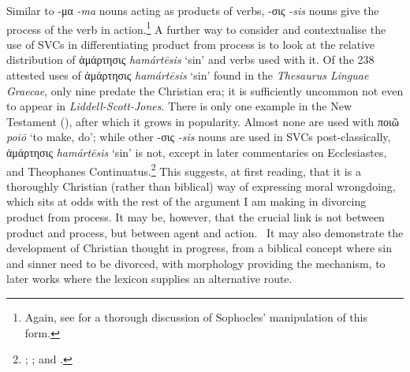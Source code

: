 \documentclass[output=paper,colorlinks,citecolor=brown]{langscibook}
\begin{document}
Similar to -μα \textit{-ma} nouns acting as products of verbs, -σις \textit{-sis} nouns give the
process of the verb in action.\footnote{Again, see \citet{long_language_1968} for a
  thorough discussion of Sophocles' manipulation of this form.} 
  A
further way to consider and contextualise the use of SVCs in
differentiating product from process is to look at the relative
distribution of ἁμάρτησις \textit{hamártēsis} ‘sin' and verbs used with it. 
Of the 238 attested
uses of ἁμάρτησις \textit{hamártēsis} ‘sin' found in the \textit{Thesaurus Linguae Graecae}, only nine predate the Christian era; it
is sufficiently uncommon not even to appear in \textit{Liddell-Scott-Jones}. 
There is only one
example in the New Testament (), after which it grows in
popularity. 
Almost none are used with ποιῶ \textit{poiō} ‘to make, do'; while other -σις \textit{-sis} nouns are
used in SVCs post-classically, ἁμάρτησις \textit{hamártēsis} ‘sin' is not, except in later
commentaries on Ecclesiastes, and Theophanes Continuatus.\footnote{;
  ; and .} 
  This suggests, at first
reading, that it is a thoroughly Christian (rather than biblical) way of
expressing moral wrongdoing, which sits at odds with the rest of the
argument I am making in divorcing product from process. 
It may be,
however, that the crucial link is not between product and process, but
between agent and action.~
It may also demonstrate the development of
Christian thought in progress, from a biblical concept where sin and
sinner need to be divorced, with morphology providing the mechanism, to
later works where the lexicon supplies an alternative route.
\end{document}
